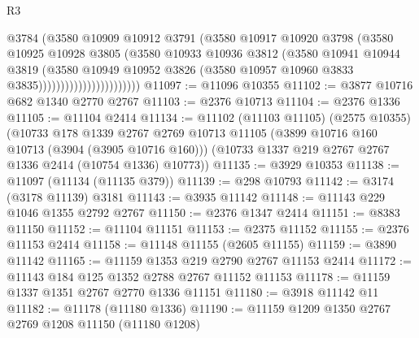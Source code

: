 \begin{lexlean}{R3}
\begin{coremodule}
                                    @3784
                                    (@3580
                                      @10909
                                      @10912
                                      @3791
                                      (@3580
                                        @10917
                                        @10920
                                        @3798
                                        (@3580
                                          @10925
                                          @10928
                                          @3805
                                          (@3580
                                            @10933
                                            @10936
                                            @3812
                                            (@3580
                                              @10941
                                              @10944
                                              @3819
                                              (@3580
                                                @10949
                                                @10952
                                                @3826
                                                (@3580
                                                  @10957
                                                  @10960
                                                  @3833
                                                  @3835)))))))))))))))))))))))
@11097 := @11096 @10355
@11102 := @3877 @10716 @682 @1340 @2770 @2767
@11103 := @2376 @10713
@11104 := @2376 @1336
@11105 := @11104 @2414
@11134 := @11102
    (@11103 @11105)
    (@2575 @10355)
    (@10733
      @178
      @1339
      @2767
      @2769
      @10713
      @11105
      (@3899 @10716 @160 @10713 (@3904 (@3905 @10716 @160)))
      (@10733 @1337 @219 @2767 @2767 @1336 @2414 (@10754 @1336) @10773))
@11135 := @3929 @10353
@11138 := @11097 (@11134 (@11135 @379))
@11139 := @298 @10793
@11142 := @3174 (@3178 @11139) @3181
@11143 := @3935 @11142
@11148 := @11143 @229 @1046 @1355 @2792 @2767
@11150 := @2376 @1347 @2414
@11151 := @8383 @11150
@11152 := @11104 @11151
@11153 := @2375 @11152
@11155 := @2376 @11153 @2414
@11158 := @11148 @11155 (@2605 @11155)
@11159 := @3890 @11142
@11165 := @11159 @1353 @219 @2790 @2767 @11153 @2414
@11172 := @11143 @184 @125 @1352 @2788 @2767 @11152 @11153
@11178 := @11159 @1337 @1351 @2767 @2770 @1336 @11151
@11180 := @3918 @11142 @11
@11182 := @11178 (@11180 @1336)
@11190 := @11159 @1209 @1350 @2767 @2769 @1208 @11150 (@11180 @1208)

\end{coremodule}
\end{lexlean}
